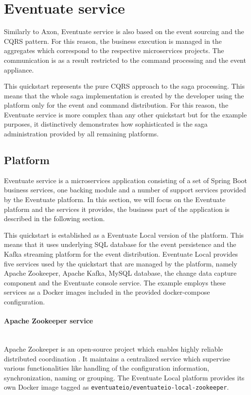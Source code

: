\documentclass[oneside,
  digital, %
  table,   %
  nolof,     %
  nolot,     %
]{fithesis3}
\newcommand{\newlinepar}[1]{\paragraph{#1}\needspace{4\baselineskip}\mbox{}\\}
\begin{document}
\section{Eventuate service}

Similarly to Axon, Eventuate service is also based on the event sourcing and the CQRS pattern. For this reason, the business execution is managed in the aggregates which correspond to the respective microservices projects. The communication is as a result restricted to the command processing and the event appliance.

This quickstart represents the pure CQRS approach to the saga processing. This means that the whole saga implementation is created by the developer using the platform only for the event and command distribution. For this reason, the Eventuate service is more complex than any other quickstart but for the example purposes, it distinctively demonstrates how sophisticated is the saga administration provided by all remaining platforms.

\subsection{Platform}
\label{sec:eventuate-platform}

Eventuate service is a microservices application consisting of a set of Spring Boot \cite{spring_boot} business services, one backing module and a number of support services provided by the Eventuate platform. In this section, we will focus on the Eventuate platform and the services it provides, the business part of the application is described in the following section.

This quickstart is established as a Eventuate Local version of the platform. This means that it uses underlying SQL database for the event persistence and the Kafka streaming platform for the event distribution. Eventuate Local provides five services used by the quickstart that are managed by the platform, namely Apache Zookeeper, Apache Kafka, MySQL database, the change data capture component and the Eventuate console service. The example employs these services as a Docker images included in the provided docker-compose configuration.

\newlinepar{Apache Zookeeper service}

Apache Zookeeper is an open-source project which enables highly reliable distributed coordination \cite{apache_zookeeper}. It maintains a centralized service which supervise various functionalities like handling of the configuration information, synchronization, naming or grouping. The Eventuate Local platform provides its own Docker image tagged as \texttt{eventuateio/eventuateio-local-zookeeper}.
\end{document}
